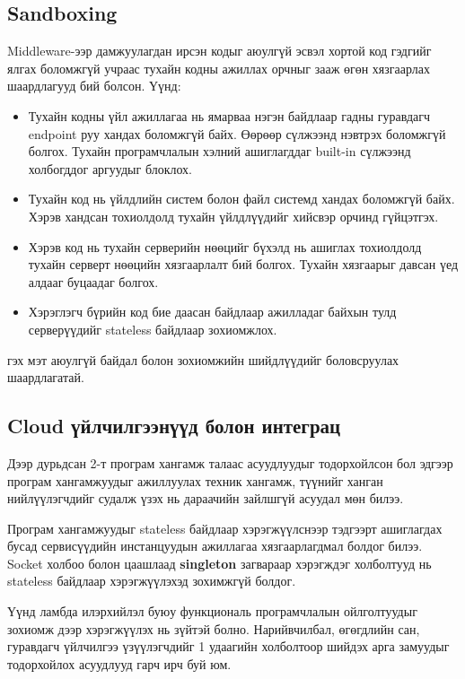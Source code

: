 \subsection{Sandboxing}
Middleware-ээр дамжуулагдан ирсэн кодыг аюулгүй эсвэл хортой код гэдгийг ялгах боломжгүй учраас тухайн кодны ажиллах орчныг зааж өгөн хязгаарлах шаардлагууд бий болсон. Үүнд:
\begin{itemize}
  \item Тухайн кодны үйл ажиллагаа нь ямарваа нэгэн байдлаар гадны гуравдагч endpoint руу хандах боломжгүй байх. Өөрөөр сүлжээнд нэвтрэх боломжгүй болгох. Тухайн програмчлалын хэлний ашиглагддаг built-in сүлжээнд холбогддог аргуудыг блоклох.
  \item Тухайн код нь үйлдлийн систем болон файл системд хандах боломжгүй байх. Хэрэв хандсан тохиолдолд тухайн үйлдлүүдийг хийсвэр орчинд гүйцэтгэх.
  \item Хэрэв код нь тухайн серверийн нөөцийг бүхэлд нь ашиглах тохиолдолд тухайн серверт нөөцийн хязгаарлалт бий болгох. Тухайн хязгаарыг давсан үед алдааг буцаадаг болгох.
  \item Хэрэглэгч бүрийн код бие даасан байдлаар ажилладаг байхын тулд серверүүдийг stateless\footnotemark{}  байдлаар зохиомжлох.
\end{itemize}
гэх мэт аюулгүй байдал болон зохиомжийн шийдлүүдийг боловсруулах шаардлагатай.

\subsection{Cloud үйлчилгээнүүд болон интеграц}
Дээр дурьдсан 2-т програм хангамж талаас асуудлуудыг тодорхойлсон бол эдгээр програм хангамжуудыг ажиллуулах техник хангамж, түүнийг ханган нийлүүлэгчдийг судалж үзэх нь дараачийн зайлшгүй асуудал мөн билээ. 

Програм хангамжуудыг stateless байдлаар хэрэгжүүлснээр тэдгээрт ашиглагдах бусад сервисүүдийн инстанцуудын ажиллагаа хязгаарлагдмал болдог билээ. Socket холбоо болон цаашлаад \textbf{singleton} загвараар хэрэгждэг холболтууд нь stateless байдлаар хэрэгжүүлэхэд зохимжгүй болдог. 

Үүнд ламбда илэрхийлэл буюу функциональ програмчлалын ойлголтуудыг зохиомж дээр хэрэгжүүлэх нь зүйтэй болно. Нарийвчилбал, өгөгдлийн сан, гуравдагч үйлчилгээ үзүүлэгчдийг 1 удаагийн холболтоор шийдэх арга замуудыг тодорхойлох асуудлууд гарч ирч буй юм.

